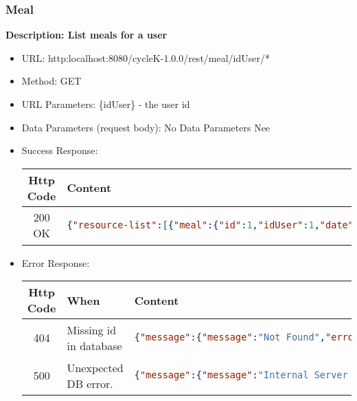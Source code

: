 \subsubsection*{Meal}

\textbf{Description: List meals for a user}

\begin{itemize}
\item URL: http:localhost:8080/cycleK-1.0.0/rest/meal/idUser/*
\item Method: GET
\item URL Parameters: \{idUser\} - the user id
\item Data Parameters (request body): No Data Parameters Nee
\item Success Response: 
\begin{longtable}{|c|p{13.5cm}|}
\hline
\textbf{Http Code} & \textbf{Content} \\\hline
200 OK  &
\begin{lstlisting}[language=json,firstnumber=1]
{"resource-list":[{"meal":{"id":1,"idUser":1,"date":"2024-10-04","mealType":3,"meal":{"meal":[{"idFood":1, "qty":80},{"idFood":2, "qty":100},{"idFood":3, "qty":300}]}}}]}
\end{lstlisting}\\\hline
\end{longtable}
\item Error Response:
\begin{longtable}{|c|p{4cm}|p{9cm}|}
\hline
\textbf{Http Code} & \textbf{When} & \textbf{Content} \\\hline
404 &  Missing id in database &
\begin{lstlisting}[language=json,firstnumber=1]
{"message":{"message":"Not Found","errorCode":"-506","errorDetails":"idUser not found for searched meals","error":true}}
\end{lstlisting}\\\hline
500 & Unexpected DB error. & 
\begin{lstlisting}[language=json,firstnumber=1]
{"message":{"message":"Internal Server Error","errorCode":"-507","errorDetails":"Unexpected Error while retrieving meals","error":true}}
\end{lstlisting}\\\hline
\end{longtable}
\end{itemize}
\newpage

